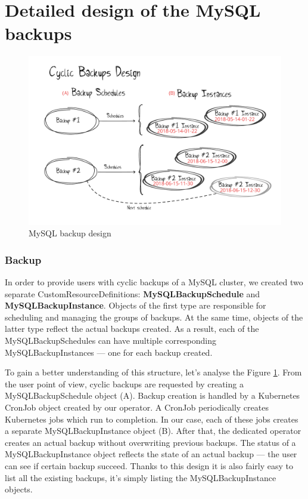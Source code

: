 \section{Detailed design of the MySQL backups}

\begin{figure}[!ht]
    \centering
    \includegraphics[width=1\textwidth, angle=0]{img/cyclic_backups.pdf}
    \caption{MySQL backup design}
    \label{fig:backups}
\end{figure}

\subsubsection*{Backup}
In order to provide users with cyclic backups of a MySQL cluster, we created 
two separate CustomResourceDefinitions: \textbf{MySQLBackupSchedule} and 
\textbf{MySQLBackupInstance}. Objects of the first type are responsible for 
scheduling and managing the groups of backups. At the same time, objects 
of the latter type reflect the actual backups created. As a result, each 
of the MySQLBackupSchedules can have multiple corresponding 
MySQLBackupInstances --- one for each backup created.

To gain a better understanding of this structure, let’s analyse the Figure 
\ref{fig:backups}. From the user point of view, cyclic backups are requested 
by creating a MySQLBackupSchedule object (A). Backup creation is handled 
by a Kubernetes CronJob object created by our operator. A CronJob periodically 
creates Kubernetes jobs which run to completion. In our case, each of these 
jobs creates a separate MySQLBackupInstance object (B). After that, the 
dedicated operator creates an actual backup without overwriting previous 
backups. The status of a MySQLBackupInstance object reflects the state of 
an actual backup --- the user can see if certain backup succeed. Thanks 
to this design it is also fairly easy to list all the existing backups, 
it’s simply listing the MySQLBackupInstance objects.

